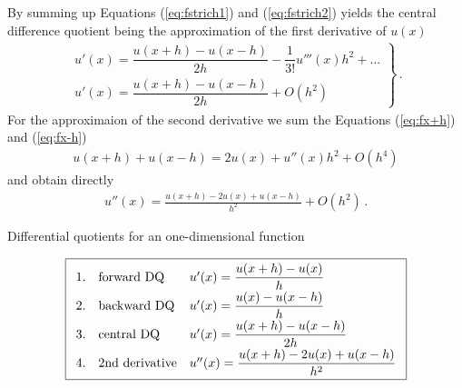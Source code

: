 By summing up Equations (\ref{eq:fstrich1}) and
(\ref{eq:fstrich2}) yields the central difference 
quotient being the approximation of the first derivative 
of $u(x)$ 
%
\begin{eqnarray}
\left. 
\begin{array}{l}
u'(x) = \dfrac{u(x+h)-u(x-h)}{2h}  - \dfrac{1}{3!} u'''(x) h^2 
+ \dots \\ [1.1ex]
u'(x) = \dfrac{u(x+h)-u(x-h)}{2h} + O(h^2)
\end{array} 
\right\} \, .
\end{eqnarray}
%
For the approximaion of the second derivative we sum the
Equations (\ref{eq:fx+h}) and (\ref{eq:fx-h})
%
\begin{eqnarray}
u(x+h)+u(x-h) = 2 u(x) + u''(x) h^2 + O(h^4)
\end{eqnarray}
%
and obtain directly 
%
\begin{eqnarray}
u''(x) = \frac{u(x+h) - 2 u(x) + u(x-h)}{h^2} + O(h^2) \, .
\end{eqnarray}
\begin{table}[htb]
\caption{Differential quotients for an one-dimensional function} 
\[
\fbox{$
\begin{array}{rll} 
\mbox{1.}&\mbox{forward DQ} &u'(x)=\dfrac{u(x+h)-u(x)}{h}\\
 [1.1ex]
\mbox{2.}&\mbox{backward DQ} &u'(x)=\dfrac{u(x)-u(x-h)}{h}\\
 [1.1ex]
\mbox{3.}&\mbox{central DQ} &u'(x)=\dfrac{u(x+h)-u(x-h)}{2h}\\ 
 [1.1ex]
\mbox{4.}&\mbox{2nd derivative}
                   &u''(x)=\dfrac{u(x+h)-2u(x)+u(x-h)}{h^2}\\
\end{array}
$}
\]
\label{table1}
\end{table}

\newpage


